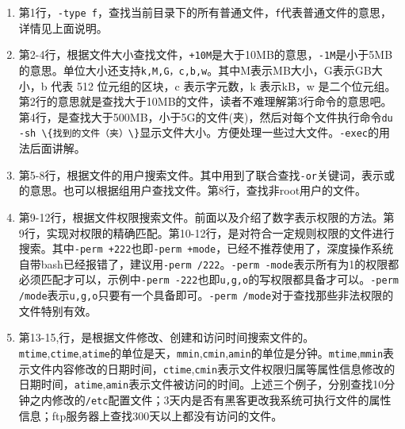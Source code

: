 \documentclass[doctor,openright,twoside]{sjtuthesis}
\providecommand{\tightlist}{%
    \setlength{\itemsep}{0pt}\setlength{\parskip}{0pt}}
\newcommand{\passthrough}[1]{#1}
\theoremstyle{plain}
\theoremstyle{definition}
\theoremstyle{remark}
\theoremstyle{ocrenumbox}
\theoremstyle{plain}
\begin{document}
\begin{enumerate}
\def\labelenumi{\arabic{enumi}.}
\tightlist
\item
  第1行，\passthrough{\lstinline!-type f!}，查找当前目录下的所有普通文件，\passthrough{\lstinline!f!}代表普通文件的意思，详情见上面说明。
\item
  第2-4行，根据文件大小查找文件，\passthrough{\lstinline!+10M!}是大于10MB的意思，\passthrough{\lstinline!-1M!}是小于5MB的意思。单位大小还支持\passthrough{\lstinline!k,M,G，c,b,w!}。其中M表示MB大小，G表示GB大小，b
  代表 512 位元组的区块，c 表示字元数，k 表示kB，w
  是二个位元组。第2行的意思就是查找大于10MB的文件，读者不难理解第3行命令的意思吧。第4行，是查找大于500MB，小于5G的文件(夹)，然后对每个文件执行命令\passthrough{\lstinline!du -sh \{找到的文件（夹）\}!}显示文件大小。方便处理一些过大文件。\passthrough{\lstinline!-exec!}的用法后面讲解。
\item
  第5-8行，根据文件的用户搜索文件。其中用到了联合查找\passthrough{\lstinline!-or!}关键词，表示或的意思。也可以根据组用户查找文件。第8行，查找非root用户的文件。
\item
  第9-12行，根据文件权限搜索文件。前面以及介绍了数字表示权限的方法。第9行，实现对权限的精确匹配。第10-12行，是对符合一定规则权限的文件进行搜索。其中\passthrough{\lstinline!-perm +222!}也即\passthrough{\lstinline!-perm +mode!}，已经不推荐使用了，深度操作系统自带bash已经报错了，建议用\passthrough{\lstinline!-perm /222!}。\passthrough{\lstinline!-perm -mode!}表示所有为1的权限都必须匹配才可以，示例中\passthrough{\lstinline!-perm -222!}也即\passthrough{\lstinline!u,g,o!}的写权限都具备才可以。\passthrough{\lstinline!-perm /mode!}表示\passthrough{\lstinline!u,g,o!}只要有一个具备即可。\passthrough{\lstinline!-perm /mode!}对于查找那些非法权限的文件特别有效。
\item
  第13-15,行，是根据文件修改、创建和访问时间搜索文件的。\passthrough{\lstinline!mtime!},\passthrough{\lstinline!ctime!},\passthrough{\lstinline!atime!}的单位是天，\passthrough{\lstinline!mmin!},\passthrough{\lstinline!cmin!},\passthrough{\lstinline!amin!}的单位是分钟。\passthrough{\lstinline!mtime!},\passthrough{\lstinline!mmin!}表示文件内容修改的日期时间，\passthrough{\lstinline!ctime!},\passthrough{\lstinline!cmin!}表示文件权限归属等属性信息修改的日期时间，\passthrough{\lstinline!atime!},\passthrough{\lstinline!amin!}表示文件被访问的时间。上述三个例子，分别查找10分钟之内修改的\passthrough{\lstinline!/etc!}配置文件；3天内是否有黑客更改我系统可执行文件的属性信息；ftp服务器上查找300天以上都没有访问的文件。
\end{enumerate}
\end{document}
